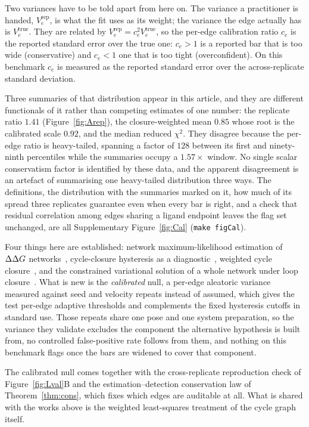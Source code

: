 Two variances have to be told apart from here on. The variance a practitioner is handed,
$V_e^{\mathrm{rep}}$, is what the fit uses as its weight; the variance the edge actually has is
$V_e^{\mathrm{true}}$. They are related by $V_e^{\mathrm{rep}}=c_e^2V_e^{\mathrm{true}}$, so the
per-edge calibration ratio $c_e$ is the reported standard error over the true one: $c_e>1$ is a
reported bar that is too wide (conservative) and $c_e<1$ one that is too tight (overconfident). On
this benchmark $c_e$ is measured as the reported standard error over the across-replicate standard
deviation.

Three summaries of that distribution appear in this article, and they are different functionals
of it rather than competing estimates of one number: the replicate ratio $1.41$
(Figure~\ref{fig:Arep}), the closure-weighted mean $0.85$ whose root is the calibrated scale
$0.92$, and the median reduced $\chi^2$. They disagree because the per-edge ratio is heavy-tailed,
spanning a factor of $128$ between its first and ninety-ninth percentiles while the summaries
occupy a $1.57\times$ window. No single scalar conservatism factor is identified by these data,
and the apparent disagreement is an artefact of summarising one heavy-tailed distribution three
ways. The definitions, the distribution with the summaries marked on it, how much of its spread
three replicates guarantee even when every bar is right, and a check that residual correlation
among edges sharing a ligand endpoint leaves the flag set unchanged, are all Supplementary
Figure~\ref{fig:Cal} (\texttt{make figCal}).

Four things here are established: network maximum-likelihood
estimation of $\Delta\Delta G$ networks~\citep{xu2019diffnet}, cycle-closure hysteresis as a
diagnostic~\citep{wang2015fep,cui2020hysteresis}, weighted cycle closure~\citep{li2023wcc}, and the
constrained variational solution of a whole network under loop closure~\citep{giese2021variational}.
What is new is the \emph{calibrated} null, a per-edge aleatoric variance measured
against seed and velocity repeats instead of assumed, which gives the test per-edge adaptive
thresholds and complements the fixed hysteresis cutoffs in standard use. Those repeats share one
pose and one system preparation, so the variance they validate excludes the component the
alternative hypothesis is built from, no controlled false-positive rate follows from them, and
nothing on this benchmark flags once the bars are widened to cover that component.

The calibrated null comes together with the cross-replicate reproduction check of
Figure~\ref{fig:Lval}B and the estimation--detection conservation law of Theorem~\ref{thm:cons},
which fixes which edges are auditable at all. What is shared with the works above is the weighted
least-squares treatment of the cycle graph itself.

